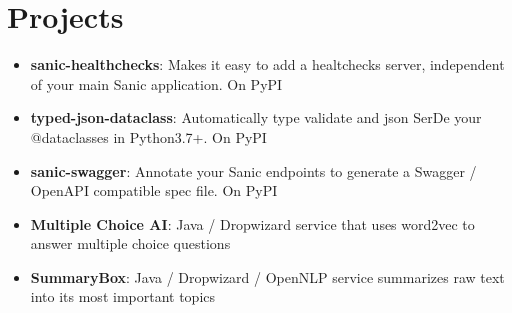 \documentclass[letterpaper,11pt]{article}
\newcommand{\resumeItem}[2]{
  \item\small{
    \textbf{#1}{: #2 \vspace{-2pt}}
  }
}
\newcommand{\resumeSubItem}[2]{\resumeItem{#1}{#2}\vspace{-4pt}}
\newcommand{\resumeSubHeadingListStart}{\begin{itemize}[leftmargin=*]}
\newcommand{\resumeSubHeadingListEnd}{\end{itemize}}
\begin{document}
\section{Projects}
  \resumeSubHeadingListStart
  \resumeSubItem{sanic-healthchecks}
      {Makes it easy to add a healtchecks server, independent of your main Sanic application. On PyPI}
    \resumeSubItem{typed-json-dataclass}
      {Automatically type validate and json SerDe your @dataclasses in Python3.7+. On PyPI}
    \resumeSubItem{sanic-swagger}
      {Annotate your Sanic endpoints to generate a Swagger / OpenAPI compatible
      spec file. On PyPI}
    \resumeSubItem{Multiple Choice AI}
      {Java / Dropwizard service that uses word2vec to answer
      multiple choice questions}
    \resumeSubItem{SummaryBox}
      {Java / Dropwizard / OpenNLP service summarizes raw text into its most
      important topics}
  \resumeSubHeadingListEnd
\end{document}
